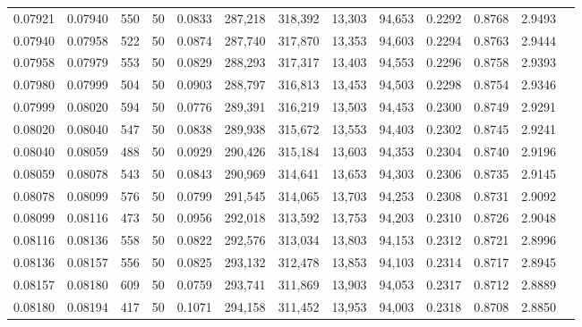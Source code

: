 \begin{tabular}{rrrrrrrrrrrrr}
0.07921 & 0.07940 &   550 &  50 &                                     0.0833 & 287,218 & 318,392 &  13,303 &  94,653 & 0.2292 & 0.8768 & 2.9493 \\
0.07940 & 0.07958 &   522 &  50 &                                     0.0874 & 287,740 & 317,870 &  13,353 &  94,603 & 0.2294 & 0.8763 & 2.9444 \\
0.07958 & 0.07979 &   553 &  50 &                                     0.0829 & 288,293 & 317,317 &  13,403 &  94,553 & 0.2296 & 0.8758 & 2.9393 \\
0.07980 & 0.07999 &   504 &  50 &                                     0.0903 & 288,797 & 316,813 &  13,453 &  94,503 & 0.2298 & 0.8754 & 2.9346 \\
0.07999 & 0.08020 &   594 &  50 &                                     0.0776 & 289,391 & 316,219 &  13,503 &  94,453 & 0.2300 & 0.8749 & 2.9291 \\
0.08020 & 0.08040 &   547 &  50 &                                     0.0838 & 289,938 & 315,672 &  13,553 &  94,403 & 0.2302 & 0.8745 & 2.9241 \\
0.08040 & 0.08059 &   488 &  50 &                                     0.0929 & 290,426 & 315,184 &  13,603 &  94,353 & 0.2304 & 0.8740 & 2.9196 \\
0.08059 & 0.08078 &   543 &  50 &                                     0.0843 & 290,969 & 314,641 &  13,653 &  94,303 & 0.2306 & 0.8735 & 2.9145 \\
0.08078 & 0.08099 &   576 &  50 &                                     0.0799 & 291,545 & 314,065 &  13,703 &  94,253 & 0.2308 & 0.8731 & 2.9092 \\
0.08099 & 0.08116 &   473 &  50 &                                     0.0956 & 292,018 & 313,592 &  13,753 &  94,203 & 0.2310 & 0.8726 & 2.9048 \\
0.08116 & 0.08136 &   558 &  50 &                                     0.0822 & 292,576 & 313,034 &  13,803 &  94,153 & 0.2312 & 0.8721 & 2.8996 \\
0.08136 & 0.08157 &   556 &  50 &                                     0.0825 & 293,132 & 312,478 &  13,853 &  94,103 & 0.2314 & 0.8717 & 2.8945 \\
0.08157 & 0.08180 &   609 &  50 &                                     0.0759 & 293,741 & 311,869 &  13,903 &  94,053 & 0.2317 & 0.8712 & 2.8889 \\
0.08180 & 0.08194 &   417 &  50 &                                     0.1071 & 294,158 & 311,452 &  13,953 &  94,003 & 0.2318 & 0.8708 & 2.8850 \\

\end{tabular}
